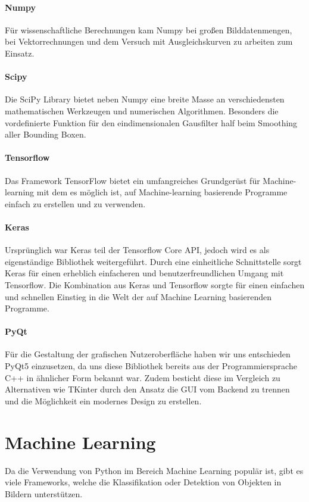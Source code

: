 \paragraph{Numpy}
Für wissenschaftliche Berechnungen kam Numpy bei großen Bilddatenmengen, bei Vektorrechnungen und dem Versuch mit Ausgleichskurven zu arbeiten zum Einsatz.

\paragraph{Scipy}
Die SciPy Library bietet neben Numpy eine breite Masse an verschiedensten mathematischen Werkzeugen und numerischen Algorithmen. Besonders die vordefinierte Funktion für den eindimensionalen Gausfilter half beim Smoothing aller Bounding Boxen.

\paragraph{Tensorflow}
Das Framework TensorFlow bietet ein umfangreiches Grundgerüst für Machine-learning mit dem es möglich ist, auf Machine-learning basierende Programme einfach zu erstellen und zu verwenden.

\paragraph{Keras}
Ursprünglich war Keras teil der Tensorflow Core API, jedoch wird es als eigenständige Bibliothek weitergeführt. Durch eine einheitliche Schnittstelle sorgt Keras für einen erheblich einfacheren und benutzerfreundlichen Umgang mit Tensorflow. Die Kombination aus Keras und Tensorflow sorgte für einen einfachen und schnellen Einstieg in die Welt der auf Machine Learning basierenden Programme.

\paragraph{PyQt}
Für die Gestaltung der grafischen Nutzeroberfläche haben wir uns entschieden PyQt5 einzusetzen, da uns diese Bibliothek bereits aus der Programmiersprache C++ in ähnlicher Form bekannt war. Zudem besticht diese im Vergleich zu Alternativen wie TKinter durch den Ansatz die GUI vom Backend zu trennen und die Möglichkeit ein modernes Design zu erstellen.

	
\section{Machine Learning}
Da die Verwendung von Python im Bereich Machine Learning populär ist, gibt es viele Frameworks, welche die Klassifikation oder Detektion von Objekten in Bildern unterstützen.

